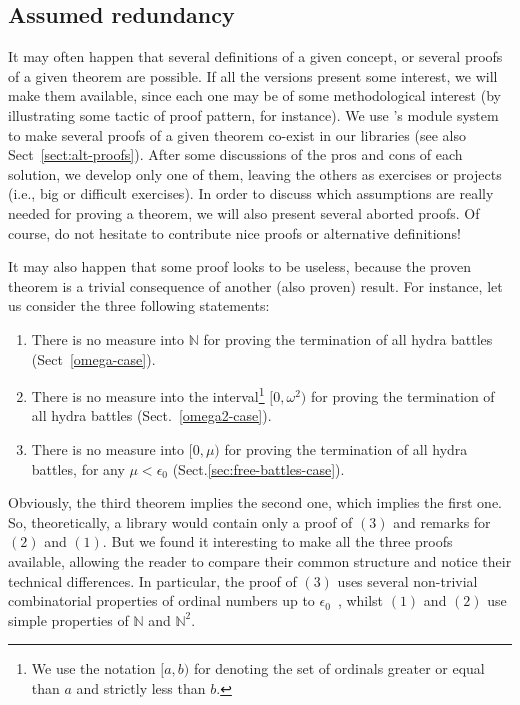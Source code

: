 \documentclass[a4paper]{book}
\begin{document}
\subsection{Assumed redundancy}

It may often happen that several definitions of a given concept, or several proofs of a given theorem are possible. If all the versions present some interest, we will make them available, since each one may be of some methodological 
interest (by illustrating some tactic of proof pattern, for instance).
We use \coq's module system to make several proofs of a given theorem co-exist in our libraries (see also Sect~\vref{sect:alt-proofs}).
After some discussions of the pros and cons of each solution, we develop only one of them, leaving the others  as exercises or projects (i.e., big or difficult exercises).
In order to discuss which assumptions are really needed for proving a theorem, we will also present 
several aborted proofs.
Of course, do not hesitate to contribute nice proofs or alternative definitions!

It may also happen that some proof looks to be useless, because the proven theorem is a trivial consequence of another (also proven) result.
For instance, let us consider the three following statements:
\begin{enumerate}
\item There is no measure into $\mathbb{N}$ for proving the termination of all hydra battles (Sect~\vref{omega-case}).
\item There is no measure into the interval\footnote{We use the notation $[a,b)$ for denoting the set of ordinals greater or equal than $a$ and strictly less than $b$.}  $[0,\omega^2)$ for proving the termination of all hydra battles (Sect.~\vref{omega2-case}).
\item There is no measure into $[0,\mu)$ for proving the termination of all hydra battles, for any $\mu<\epsilon_0$ (Sect.\vref{sec:free-battles-case}).
\end{enumerate}

Obviously, the third theorem implies the second one, which implies the first one. So, theoretically, a library would contain only a proof of $(3)$ and remarks for $(2)$ and $(1)$. But we found it interesting to make all the three proofs available, allowing the reader to compare their common structure and notice their technical differences.
In particular, the proof of $(3)$ uses several non-trivial combinatorial properties of ordinal numbers up to $\epsilon_0$~\cite{KS81}, whilst $(1)$ and $(2)$ use simple properties of $\mathbb{N}$ and $\mathbb{N}^2$.
\end{document}
